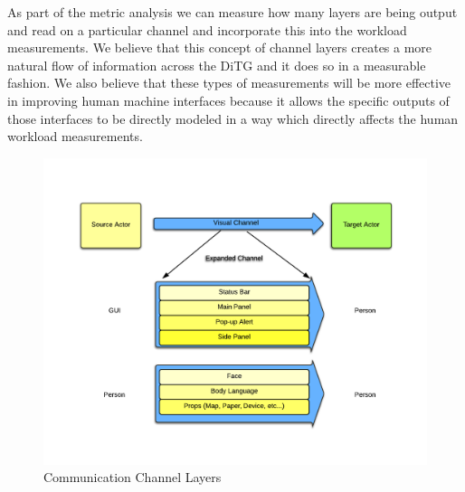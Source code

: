 As part of the metric analysis we can measure how many layers are being output and read on a particular channel and incorporate this into the workload measurements.  We believe that this concept of channel layers creates a more natural flow of information across the DiTG and it does so in a measurable fashion.  We also believe that these types of measurements will be more effective in improving human machine interfaces because it allows the specific outputs of those interfaces to be directly modeled in a way which directly affects the human workload measurements. 

\begin{figure}[h]
\begin{center}
\includegraphics[width=5in]{layers.png}
\caption{Communication Channel Layers}
\label{fig:layers}
\end{center}
\end{figure}
